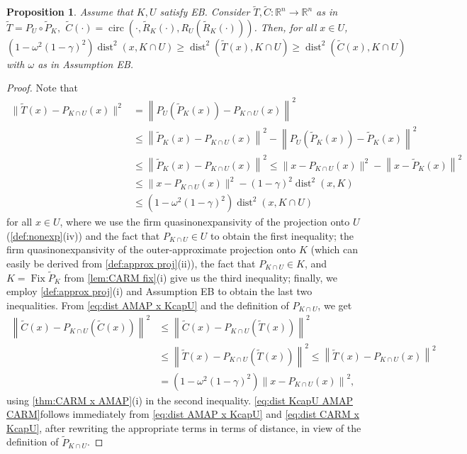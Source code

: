 \documentclass[smallextended,numbook,nospthms]{svjour3}
\theoremstyle{plain}
\newtheorem{proposition}[theorem]{Proposition}
\theoremstyle{definition}
\def\RR{\mathds R}
\DeclareMathOperator{\Fix}{Fix}
\DeclareMathOperator{\dist}{dist}
\DeclareMathOperator{\circum}{circ}
\begin{document}
\begin{proposition}\label{prop:EB dist}
	Assume that $K, U$ satisfy EB. Consider $\tilde{T}, \tilde{C}: \RR^{n} \rightarrow \RR^{n}$ as in $\tilde{T}=P_{U} \circ \tilde{P}_{K},$ $\tilde{C}(\cdot)=\circum\left(\cdot, \tilde{R}_{K}(\cdot), R_{U}\left(\tilde{R}_{K}(\cdot)\right)\right)$. Then, for all $x \in U$,
	\begin{equation}\label{eq:dist KcapU AMAP CARM}
		\left(1-\omega^{2}(1-\gamma)^2\right) \dist^{2}(x, K \cap U) \geq \dist^{2}(\tilde{T}(x), K \cap U) \geq \dist^{2}(\tilde{C}(x), K \cap U)
	\end{equation}
	with $\omega$ as in Assumption EB.
\end{proposition}
\begin{proof}
    Note that
	\begin{align}
		\|\tilde{T}(x)-P_{K \cap U}(x)\|^{2} &=\left\|P_{U}\left(\tilde{P}_{K}(x)\right)-P_{K \cap U}(x)\right\|^{2} \\
		&\leq \left\|\tilde{P}_{K}(x)-P_{K \cap U}(x)\right\|^{2}-\left\|P_{U}\left(\tilde{P}_{K}(x)\right)-\tilde{P}_{K}(x)\right\|^{2} \\ &\leq\left\|\tilde{P}_{K}(x)-P_{K \cap U}(x)\right\|^{2} \leq\|x-P_{K \cap U}(x)\|^{2}-\left\|x-\tilde{P}_{K}(x)\right\|^{2} \\
		&\leq \|x-P_{K \cap U}(x)\|^{2}-(1-\gamma)^2\dist^{2}(x, K) \\ &\leq (1-\omega^{2}(1-\gamma)^{2}) \dist^{2}(x, K \cap U) \label{eq:dist AMAP x KcapU}
	\end{align}
	for all $x \in U$,  where we use the firm quasinonexpansivity of the projection onto $U$ (\cref{def:nonexp}(iv)) and the fact that $P_{K \cap U} \in U$ to obtain the first inequality; the
	firm quasinonexpansivity of the outer-approximate projection onto $K$ (which can easily be derived from \cref{def:approx proj}(ii)), the fact that $P_{K \cap U} \in K$, and  $K = \Fix \tilde{P}_{K}$ from \cref{lem:CARM fix}(i) give us the third inequality; finally, we employ \cref{def:approx proj}(i) and Assumption EB to obtain the last two inequalities. From \cref{eq:dist AMAP x KcapU} and the definition of $P_{K \cap U}$, we get
	\begin{align}
		\left\|\tilde{C}(x)-P_{K \cap U}(\tilde{C}(x))\right\|^{2} & \leq\left\|\tilde{C}(x)-P_{K \cap U}(\tilde{T}(x))\right\|^{2}  \\
		& \leq\left\|\tilde{T}(x)-P_{K \cap U}(\tilde{T}(x))\right\|^{2} \leq\left\|\tilde{T}(x)-P_{K \cap U}(x)\right\|^{2}  \\
		&=\left(1-\omega^{2}(1-\gamma)^{2}\right)\left\|x-P_{K \cap U}(x)\right\|^{2},\label{eq:dist CARM x KcapU}
	\end{align}
	using \cref{thm:CARM x AMAP}(i) in the second inequality.  \cref{eq:dist KcapU AMAP CARM}follows immediately from \cref{eq:dist AMAP x KcapU} and \cref{eq:dist CARM x KcapU}, after rewriting the appropriate terms in terms of distance, in view of the definition of $\tilde{P}_{K \cap U}$.
	\end{proof}
\end{document}
